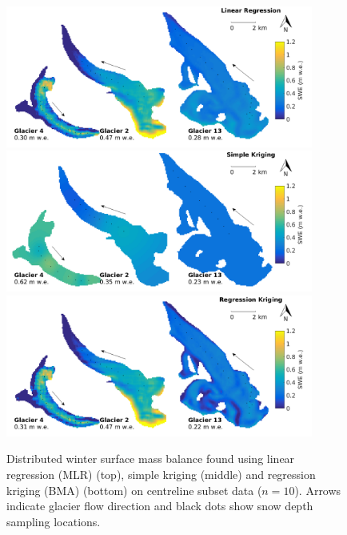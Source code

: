 \documentclass[12pt]{article}
\newcommand{\topomap}{Arrows indicate glacier flow direction and black dots show snow depth sampling locations. }
\begin{document}
\begin{figure}[H]
	\centering
	\includegraphics[width =0.9\textwidth]{MapSubset_LRcentreline_n10S4.png}\\
	\includegraphics[width =0.9\textwidth]{MapSubset_SKcentreline_n10S4.png}\\
	\includegraphics[width =0.9\textwidth]{MapSubset_RKcentreline_n10S4.png}\\
	\caption{Distributed winter surface mass balance found using  linear regression (MLR) (top), simple kriging (middle) and regression kriging (BMA) (bottom) on centreline subset data ($n=10$).  \topomap}
	\label{fig:MapSubset_centreline_n10S4}
\end{figure}



\end{document}
